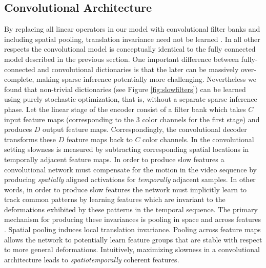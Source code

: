 \documentclass{article} %
\begin{document}
\subsection{Convolutional Architecture}
By replacing all linear operators in our model with convolutional filter banks and including spatial pooling, translation invariance need not be learned \cite{LeCun1998}. In all other respects the convolutional model is conceptually identical to the fully connected model described in the previous section. One important difference between fully-connected and convolutional dictionaries is that the later can be massively over-complete, making sparse inference potentially more challenging. Nevertheless we found that non-trivial dictionaries (see Figure \ref{fig:slowfilters}) can be learned using purely stochastic optimization, that is, without a separate sparse inference phase. Let the linear stage of the encoder consist of a filter bank which takes $C$ input feature maps (corresponding to the 3 color channels for the first stage) and produces $D$ output feature maps. Correspondingly, the convolutional decoder transforms these $D$ feature maps back to $C$ color channels. In the convolutional setting slowness is measured by subtracting corresponding spatial locations in temporally adjacent feature maps. In order to produce slow features a convolutional network must compensate for the motion in the video sequence by producing \emph{spatially} aligned activations for \emph{temporally} adjacent samples. In other words, in order to produce slow features the network must implicitly learn to track common patterns by learning features which are invariant to the deformations exhibited by these patterns in the temporal sequence. The primary mechanism for producing these invariances is pooling in space and across features \cite{MaxOut}. Spatial pooling induces local translation invariance. Pooling across feature maps allows the network to potentially learn feature groups that are stable with respect to more general deformations. Intuitively, maximizing slowness in a convolutional architecture leads to \emph{spatiotemporally} coherent features. 
\end{document}
